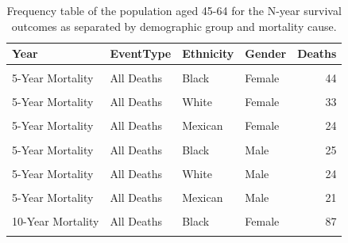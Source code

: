 \documentclass[
]{article}
\begin{document}
\begin{table}[!h]

\caption{\label{tab:DeathFreq1}Frequency table of the population aged 45-64 for the N-year survival outcomes as separated by demographic group and mortality cause.}
\centering
\begin{tabular}[t]{llllr}
\toprule
Year & EventType & Ethnicity & Gender & Deaths\\
\midrule
\cellcolor{gray!6}{5-Year Mortality} & \cellcolor{gray!6}{CVD} & \cellcolor{gray!6}{Black} & \cellcolor{gray!6}{Female} & \cellcolor{gray!6}{15}\\
5-Year Mortality & All Deaths & Black & Female & 44\\
\cellcolor{gray!6}{5-Year Mortality} & \cellcolor{gray!6}{CVD} & \cellcolor{gray!6}{White} & \cellcolor{gray!6}{Female} & \cellcolor{gray!6}{9}\\
5-Year Mortality & All Deaths & White & Female & 33\\
\cellcolor{gray!6}{5-Year Mortality} & \cellcolor{gray!6}{CVD} & \cellcolor{gray!6}{Mexican} & \cellcolor{gray!6}{Female} & \cellcolor{gray!6}{9}\\
5-Year Mortality & All Deaths & Mexican & Female & 24\\
\cellcolor{gray!6}{5-Year Mortality} & \cellcolor{gray!6}{CVD} & \cellcolor{gray!6}{Black} & \cellcolor{gray!6}{Male} & \cellcolor{gray!6}{6}\\
5-Year Mortality & All Deaths & Black & Male & 25\\
\cellcolor{gray!6}{5-Year Mortality} & \cellcolor{gray!6}{CVD} & \cellcolor{gray!6}{White} & \cellcolor{gray!6}{Male} & \cellcolor{gray!6}{7}\\
5-Year Mortality & All Deaths & White & Male & 24\\
\cellcolor{gray!6}{5-Year Mortality} & \cellcolor{gray!6}{CVD} & \cellcolor{gray!6}{Mexican} & \cellcolor{gray!6}{Male} & \cellcolor{gray!6}{6}\\
5-Year Mortality & All Deaths & Mexican & Male & 21\\
\addlinespace
\cellcolor{gray!6}{10-Year Mortality} & \cellcolor{gray!6}{CVD} & \cellcolor{gray!6}{Black} & \cellcolor{gray!6}{Female} & \cellcolor{gray!6}{23}\\
10-Year Mortality & All Deaths & Black & Female & 87\\
\cellcolor{gray!6}{10-Year Mortality} & \cellcolor{gray!6}{CVD} & \cellcolor{gray!6}{White} & \cellcolor{gray!6}{Female} & \cellcolor{gray!6}{21}\\

\end{tabular}
\end{table}
\end{document}
